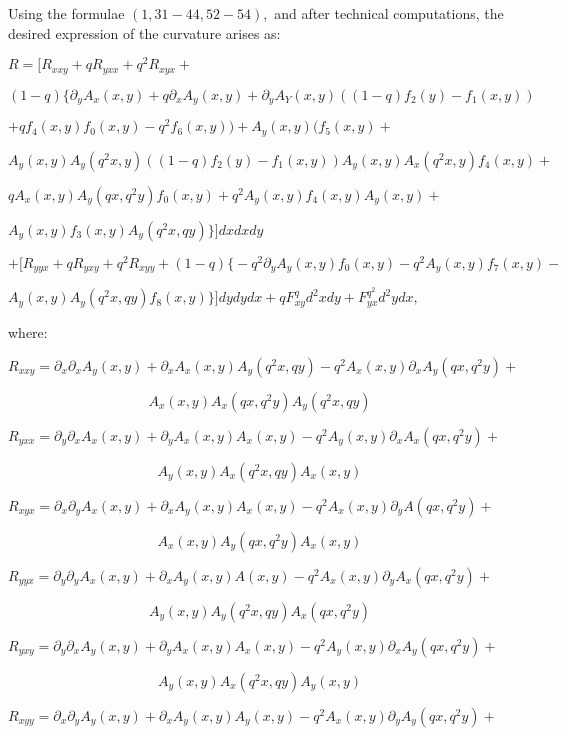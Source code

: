 \documentclass[a4paper,12pt,thmsa]{article}
\begin{document}
Using the formulae $(1,31-44,52-54),$ and after technical computations, the
desired expression of the curvature arises as:

$R=\Big[ R_{xxy}+qR_{yxx}+q^2R_{xyx}+$

$(1-q)\Big\{ \partial _yA_x(x,y)+q\partial _xA_y(x,y)+\partial
_yA_Y(x,y)((1-q)f_2(y)-f_1(x,y))$

$+qf_4(x,y)f_0(x,y)-q^2f_6(x,y))+A_y(x,y)(f_5(x,y)+$

$A_y(x,y)A_y(q^2x,y)((1-q)f_2(y)-f_1(x,y))A_y(x,y)A_x(q^2x,y)f_4(x,y)+$

$qA_x(x,y)A_y(qx,q^2y)f_0(x,y)+q^2A_y(x,y)f_4(x,y)A_y(x,y)+$

$A_y(x,y)f_3(x,y)A_y(q^2x,qy) \Big\} \Big] dxdxdy$

$+\Big[ R_{yyx}+qR_{yxy}+q^2R_{xyy}+(1-q) \Big\{ -q^2\partial
_yA_y(x,y)f_0(x,y)-q^2A_y(x,y)f_7(x,y)-$

$A_y(x,y)A_y(q^2x,qy)f_8(x,y)\Big\} \Big] %
dydydx+qF_{xy}^qd^2xdy+F_{yx}^{q^2}d^2ydx,$

\vspace{0.5cm}

where:
\vspace{0.5cm}


$R_{xxy}=\partial _x\partial _xA_y(x,y)+\partial
_xA_x(x,y)A_y(q^2x,qy)-q^2A_x(x,y)\partial _xA_y(qx,q^2y)+$

\[
A_x(x,y)A_x(qx,q^2y)A_y(q^2x,qy)
\]

$R_{yxx}=\partial _y\partial _xA_x(x,y)+\partial
_yA_x(x,y)A_x(x,y)-q^2A_y(x,y)\partial _xA_x(qx,q^2y)+$

\[
A_y(x,y)A_x(q^2x,qy)A_x(x,y)
\]

$R_{xyx}=\partial _x\partial _yA_x(x,y)+\partial
_xA_y(x,y)A_x(x,y)-q^2A_x(x,y)\partial _yA(qx,q^2y)+$

\begin{equation}
A_x(x,y)A_y(qx,q^2y)A_x(x,y)
\end{equation}

$R_{yyx}=\partial _y\partial _yA_x(x,y)+\partial
_xA_y(x,y)A(x,y)-q^2A_x(x,y)\partial _yA_x(qx,q^2y)+$

\[
A_y(x,y)A_y(q^2x,qy)A_x(qx,q^2y)
\]

$R_{yxy}=\partial _y\partial _xA_y(x,y)+\partial
_yA_x(x,y)A_x(x,y)-q^2A_y(x,y)\partial _xA_y(qx,q^2y)+$

\[
A_y(x,y)A_x(q^2x,qy)A_y(x,y)
\]

$R_{xyy}=\partial _x\partial _yA_y(x,y)+\partial
_xA_y(x,y)A_y(x,y)-q^2A_x(x,y)\partial _yA_y(qx,q^2y)+$
\end{document}
